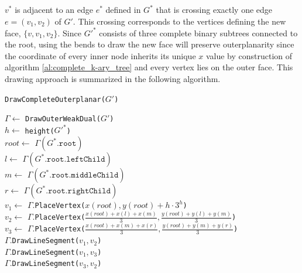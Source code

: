 $v^*$ is adjacent to an edge $e^*$ defined in $G^*$ that is crossing exactly one edge $e = (v_1,v_2)$ of $G'$. This crossing corresponds to the vertices defining the new face, $\{v, v_1, v_2\}$. Since $G'^*$ consists of three complete binary subtrees connected to the root, using the bends to draw the new face will preserve outerplanarity since the coordinate of every inner node inherits its unique $x$ value by construction of algorithm \ref{al:complete_k-ary_tree} and every vertex lies on the outer face.
This drawing approach is summarized in the following algorithm.\\
\begin{algorithm}[H]
	\caption{\texttt{DrawCompleteOuterplanar($G'$)}}\label{al:complete_outerplanar}\label{algo:complete_outerplanar_graph_dual}
	$\Gamma \gets $ \texttt{DrawOuterWeakDual($G'$)}\\
	$h \gets$ \texttt{height($G'^*$)}\\
	$root \gets$ $\Gamma(G^*.\texttt{root})$\\
	$l \gets$ $\Gamma(G^*.\texttt{root.leftChild})$\\
	$m \gets$ $\Gamma(G^*.\texttt{root.middleChild})$\\
	$r \gets$ $\Gamma(G^*.\texttt{root.rightChild})$\\
	$v_1 \gets$ $\Gamma$.\texttt{PlaceVertex($x(root),y(root)+h\cdot 3^h$)}\\
	$v_2 \gets$ $\Gamma$.\texttt{PlaceVertex($\frac{x(root)+x(l)+x(m)}{3},\frac{y(root)+y(l)+y(m)}{3}$)}\\
	$v_3 \gets$ $\Gamma$.\texttt{PlaceVertex($\frac{x(root)+x(m)+x(r)}{3},\frac{y(root)+y(m)+y(r )}{3}$)}\\
	$\Gamma$.\texttt{DrawLineSegment($v_1,v_2$)}\\
	$\Gamma$.\texttt{DrawLineSegment($v_1,v_3$)}\\
	$\Gamma$.\texttt{DrawLineSegment($v_3,v_2$)}\\
	

\end{algorithm}
